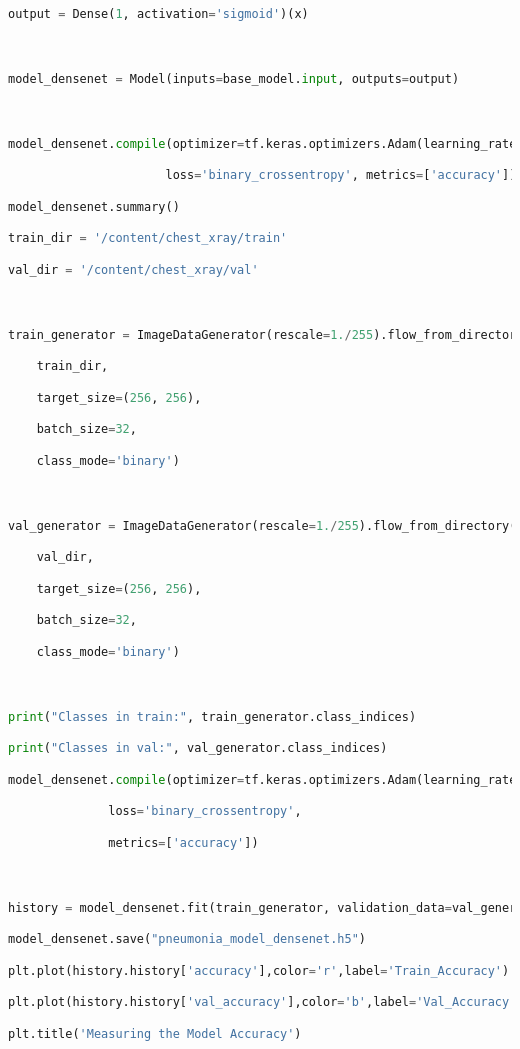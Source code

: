 \documentclass{article}
\begin{document}
\begin{lstlisting}[style=mystyle,language=Python]
output = Dense(1, activation='sigmoid')(x)



model_densenet = Model(inputs=base_model.input, outputs=output)



model_densenet.compile(optimizer=tf.keras.optimizers.Adam(learning_rate=0.0001),

                      loss='binary_crossentropy', metrics=['accuracy'])

model_densenet.summary()

train_dir = '/content/chest_xray/train'

val_dir = '/content/chest_xray/val'



train_generator = ImageDataGenerator(rescale=1./255).flow_from_directory(

    train_dir,

    target_size=(256, 256),

    batch_size=32,

    class_mode='binary')



val_generator = ImageDataGenerator(rescale=1./255).flow_from_directory(

    val_dir,

    target_size=(256, 256),

    batch_size=32,

    class_mode='binary')



print("Classes in train:", train_generator.class_indices)

print("Classes in val:", val_generator.class_indices)

model_densenet.compile(optimizer=tf.keras.optimizers.Adam(learning_rate=0.0001),

              loss='binary_crossentropy',

              metrics=['accuracy'])



history = model_densenet.fit(train_generator, validation_data=val_generator, epochs=10)

model_densenet.save("pneumonia_model_densenet.h5")

plt.plot(history.history['accuracy'],color='r',label='Train_Accuracy')

plt.plot(history.history['val_accuracy'],color='b',label='Val_Accuracy')

plt.title('Measuring the Model Accuracy')


\end{lstlisting}
\end{document}
